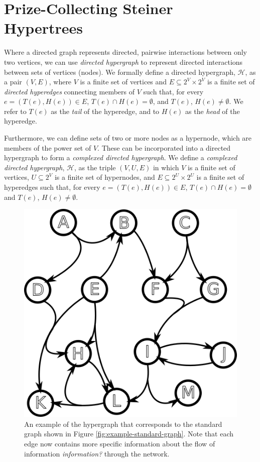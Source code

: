 \documentclass[12pt,twoside]{reedthesis}
\theoremstyle{definition}
\begin{document}
\section{Prize-Collecting Steiner Hypertrees}

Where a directed graph represents directed, pairwise interactions between only two vertices, we can use \textit{directed hypergraph} to represent directed interactions between sets of vertices (nodes). We formally define a directed hypergraph, $\mathcal{H}$, as a pair $(V,E)$, where $V$ is a finite set of vertices and $E \subseteq 2^V \times 2^V$ is a finite set of \textit{directed hyperedges} connecting members of $V$ such that, for every $e=(T(e),H(e)) \in E$, $T(e) \cap H(e) = \emptyset$, and $T(e)$, $H(e) \neq \emptyset$.  We refer to $T(e)$ as the \textit{tail} of the hyperedge, and to $H(e)$ as the \textit{head} of the hyperedge.\par

Furthermore, we can define sets of two or more nodes as a hypernode, which are members of the power set of $V$.  These can be incorporated into a directed hypergraph to form a \textit{complexed directed hypergraph}.  We define a \textit{complexed directed hypergraph}, $\mathcal{H}$, as the triple $(V,U,E)$ in which $V$ is a finite set of vertices, $U \subseteq 2^V$ is a finite set of hypernodes, and $E \subseteq 2^U \times 2^U$ is a finite set of hyperedges such that, for every $e=(T(e),H(e)) \in E$, $T(e) \cap H(e) = \emptyset$ and $T(e)$, $H(e) \neq \emptyset$.\par

\begin{figure}[thbp]
  \begin{center}
    \includegraphics{example-hypergraph}
  \caption{An example of the hypergraph that corresponds to the standard graph shown in Figure \ref{fig:example-standard-graph}. Note that each edge now contains more specific information about the flow of information \textit{information?} through the network.}
  \label{fig:example-hypergraph}
  \end{center}
\end{figure}
\end{document}
